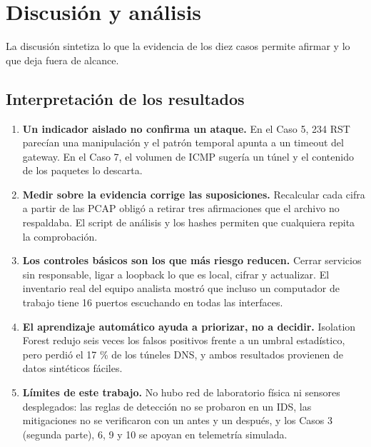 \chapter{Discusi\'on y an\'alisis}
\label{ch:discusion}
La discusi\'on sintetiza lo que la evidencia de los diez casos permite afirmar y lo que deja fuera de alcance.

\section{Interpretaci\'on de los resultados}
\begin{enumerate}
  \item \textbf{Un indicador aislado no confirma un ataque.} En el Caso 5, 234 RST parecían una manipulación y el patrón temporal apunta a un timeout del gateway. En el Caso 7, el volumen de ICMP sugería un túnel y el contenido de los paquetes lo descarta.
  \item \textbf{Medir sobre la evidencia corrige las suposiciones.} Recalcular cada cifra a partir de las PCAP obligó a retirar tres afirmaciones que el archivo no respaldaba. El script de análisis y los hashes permiten que cualquiera repita la comprobación.
  \item \textbf{Los controles básicos son los que más riesgo reducen.} Cerrar servicios sin responsable, ligar a loopback lo que es local, cifrar y actualizar. El inventario real del equipo analista mostró que incluso un computador de trabajo tiene 16 puertos escuchando en todas las interfaces.
  \item \textbf{El aprendizaje automático ayuda a priorizar, no a decidir.} Isolation Forest redujo seis veces los falsos positivos frente a un umbral estadístico, pero perdió el 17 \% de los túneles DNS, y ambos resultados provienen de datos sintéticos fáciles.
  \item \textbf{Límites de este trabajo.} No hubo red de laboratorio física ni sensores desplegados: las reglas de detección no se probaron en un IDS, las mitigaciones no se verificaron con un antes y un después, y los Casos 3 (segunda parte), 6, 9 y 10 se apoyan en telemetría simulada.
\end{enumerate}
